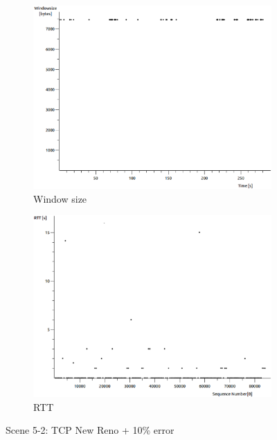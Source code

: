 \documentclass[conference,a4paper]{../../sty/IEEEtran}
\begin{document}
\begin{figure}
\begin{subfigure}[b]{0.2\textwidth}
  \includegraphics[width=\textwidth]{s5-2_wsize}
  \caption{Window size}
 \end{subfigure}
 \begin{subfigure}[b]{0.2\textwidth}
  \includegraphics[width=\textwidth]{s5-2_rtt}
  \caption{RTT}
 \end{subfigure}
 \caption{Scene 5-2: TCP New Reno + 10\% error}
\end{figure}
\end{document}
